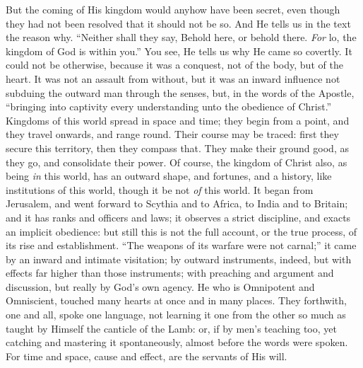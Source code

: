 But the coming of His kingdom would anyhow have been
secret, even though they had not been resolved that it
should not be so. And He tells us in the text the reason
why. ``Neither shall they say, Behold here, or
behold there. \emph{For} lo, the kingdom of God is within
you.'' You see, He tells us why He came so covertly.
It could not be otherwise, because it was a conquest, not
of the body, but of the heart. It was not an assault from
without, but it was an inward influence not subduing the
outward man through the senses, but, in the words of the
Apostle, ``bringing into captivity every
understanding unto the obedience of Christ.''
Kingdoms of this world spread in space and time; they
begin from a point, and they travel onwards, and range
round. Their course may be traced: first they secure this
territory, then they compass that. They make their ground
good, as they go, and consolidate their power. Of course,
the kingdom of Christ also, as being \emph{in} this
world, has an outward shape, and fortunes, and a history,
like institutions of this world, though it be not \emph{of}
this world. It began from Jerusalem, and went forward to
Scythia and to Africa, to India and to Britain; and it
has ranks and officers and laws; it observes a strict
discipline, and exacts an implicit obedience: but still
this is not the full account, or the true process, of its
rise and establishment. ``The weapons of its warfare
were not carnal;'' it came by an inward and intimate
visitation; by outward instruments, indeed, but with
effects far higher than those instruments; with preaching
and argument and discussion, but really by God's own
agency. He who is Omnipotent and Omniscient, touched many
hearts at once and in many places. They forthwith, one
and all, spoke one language, not learning it one from the
other so much as taught by Himself the canticle of the
Lamb: or, if by men's teaching too, yet catching and
mastering it spontaneously, almost before the words were
spoken. For time and space, cause and effect, are the
servants of His will.

